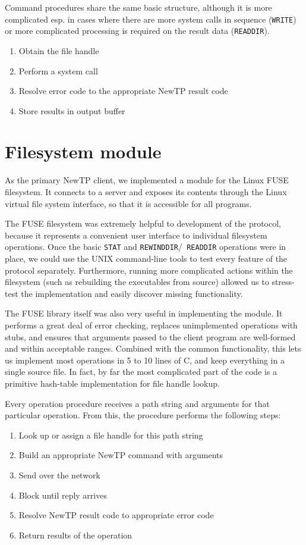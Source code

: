 Command procedures share the same basic structure, although it is more complicated esp. in cases where there
are more system calls in sequence ({\tt WRITE}) or more complicated processing is required on the result data
({\tt READDIR}).
\begin{enumerate}[nolistsep]
	\item Obtain the file handle
	\item Perform a system call
	\item Resolve error code to the appropriate NewTP result code
	\item Store results in output buffer
\end{enumerate}

\section{Filesystem module}

As the primary NewTP client, we implemented a module for the Linux FUSE filesystem. It connects to a server
and exposes its contents through the Linux virtual file system interface, so that it is accessible for all
programs.

The FUSE filesystem was extremely helpful to development of the protocol, because it represents a convenient
user interface to individual filesystem operations. Once the basic {\tt STAT} and {\tt REWINDDIR}/{\tt
READDIR} operations were in place, we could use the UNIX command-line tools to test every feature of the
protocol separately. Furthermore, running more complicated actions within the filesystem (such as rebuilding
the executables from source) allowed us to stress-test the implementation and easily discover missing
functionality.

The FUSE library itself was also very useful in implementing the module. It performs a great deal of error
checking, replaces unimplemented operations with stubs, and ensures that arguments passed to the client
program are well-formed and within acceptable ranges. Combined with the common functionality, this lets us
implement most operations in 5 to 10 lines of C, and keep everything in a single source file. In fact, by far
the most complicated part of the code is a primitive hash-table implementation for file handle lookup.

Every operation procedure receives a path string and arguments for that particular operation. From this, the
procedure performs the following steps:
\begin{enumerate}[nolistsep]
	\item Look up or assign a file handle for this path string
	\item Build an appropriate NewTP command with arguments
	\item Send over the network
	\item Block until reply arrives
	\item Resolve NewTP result code to appropriate error code
	\item Return results of the operation
\end{enumerate}

